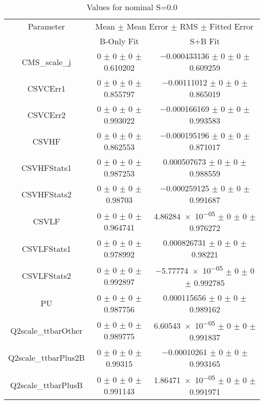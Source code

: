 \begin{table}
\centering
\caption{Values for nominal S=0.0}
\begin{tabular}{ccc}
\toprule
Parameter & \multicolumn{2}{c}{Mean $\pm$ Mean Error $\pm$ RMS $\pm$ Fitted Error}\\
 & B-Only Fit & S+B Fit\\
\midrule
CMS\_scale\_j & \num{0} $\pm$ \num{0} $\pm$ \num{0} $\pm$ \num{0.610202} & \num{-0.000433136} $\pm$ \num{0} $\pm$ \num{0} $\pm$ \num{0.609259}\\
CSVCErr1 & \num{0} $\pm$ \num{0} $\pm$ \num{0} $\pm$ \num{0.855797} & \num{-0.00111012} $\pm$ \num{0} $\pm$ \num{0} $\pm$ \num{0.865019}\\
CSVCErr2 & \num{0} $\pm$ \num{0} $\pm$ \num{0} $\pm$ \num{0.993022} & \num{-0.000166169} $\pm$ \num{0} $\pm$ \num{0} $\pm$ \num{0.993583}\\
CSVHF & \num{0} $\pm$ \num{0} $\pm$ \num{0} $\pm$ \num{0.862553} & \num{-0.000195196} $\pm$ \num{0} $\pm$ \num{0} $\pm$ \num{0.871017}\\
CSVHFStats1 & \num{0} $\pm$ \num{0} $\pm$ \num{0} $\pm$ \num{0.987253} & \num{0.000507673} $\pm$ \num{0} $\pm$ \num{0} $\pm$ \num{0.988559}\\
CSVHFStats2 & \num{0} $\pm$ \num{0} $\pm$ \num{0} $\pm$ \num{0.98703} & \num{-0.000259125} $\pm$ \num{0} $\pm$ \num{0} $\pm$ \num{0.991687}\\
CSVLF & \num{0} $\pm$ \num{0} $\pm$ \num{0} $\pm$ \num{0.964741} & \num{4.86284e-05} $\pm$ \num{0} $\pm$ \num{0} $\pm$ \num{0.976272}\\
CSVLFStats1 & \num{0} $\pm$ \num{0} $\pm$ \num{0} $\pm$ \num{0.978992} & \num{0.000826731} $\pm$ \num{0} $\pm$ \num{0} $\pm$ \num{0.98221}\\
CSVLFStats2 & \num{0} $\pm$ \num{0} $\pm$ \num{0} $\pm$ \num{0.992897} & \num{-5.77774e-05} $\pm$ \num{0} $\pm$ \num{0} $\pm$ \num{0.992785}\\
PU & \num{0} $\pm$ \num{0} $\pm$ \num{0} $\pm$ \num{0.987756} & \num{0.000115656} $\pm$ \num{0} $\pm$ \num{0} $\pm$ \num{0.989162}\\
Q2scale\_ttbarOther & \num{0} $\pm$ \num{0} $\pm$ \num{0} $\pm$ \num{0.989775} & \num{6.60543e-05} $\pm$ \num{0} $\pm$ \num{0} $\pm$ \num{0.991837}\\
Q2scale\_ttbarPlus2B & \num{0} $\pm$ \num{0} $\pm$ \num{0} $\pm$ \num{0.99315} & \num{-0.00010261} $\pm$ \num{0} $\pm$ \num{0} $\pm$ \num{0.993165}\\
Q2scale\_ttbarPlusB & \num{0} $\pm$ \num{0} $\pm$ \num{0} $\pm$ \num{0.991143} & \num{1.86471e-05} $\pm$ \num{0} $\pm$ \num{0} $\pm$ \num{0.991971}\\

\end{tabular}
\end{table}
